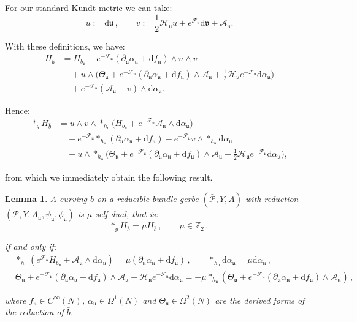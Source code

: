 \documentclass[10pt,a4paper,twoside,reqno]{amsart}
\theoremstyle{plain}
\newtheorem{lemma}[thm]{Lemma}
\theoremstyle{definition}
\theoremstyle{remark}
\def\dd{\mathrm{d}}
\def\cH{\mathcal{H}}
\def\cA{\mathcal{A}}
\def\cP{\mathcal{P}}
\def\cP{\mathcal{P}}
\def\cF{\mathcal{F}}
\def\cH{\mathcal{H}}
\def\dd{\mathrm{d}}
\def\fru{\mathfrak{u}}
\def\frv{\mathfrak{v}}
\begin{document}
\noindent
For our standard Kundt metric we can take:
\begin{equation*}
u := \dd \fru \, , \qquad v := \frac{1}{2} \cH_{\fru} u + e^{\cF_{\fru}} \dd\frv + \cA_{\fru}.
\end{equation*}

\noindent
With these definitions, we have:
\begin{align*}
H_{\bar{b}} &= H_{b_{\fru}} + e^{-\cF_{\fru}} (\partial_{\fru}\alpha_{\fru} + \dd f_{\fru})  \wedge u \wedge v \\
&\quad + u\wedge \Big(\Theta_{\fru} + e^{-\cF_{\fru}} (\partial_{\fru}\alpha_{\fru} + \dd f_{\fru}) \wedge \cA_{\fru} + \frac{1}{2}\cH_{\fru} e^{-\cF_{\fru}}   \dd \alpha_{\fru} \Big) \\
&\quad + e^{-\cF_{\fru}} (\cA_{\fru} - v)\wedge \dd \alpha_{\fru}.
\end{align*}

Hence:
\begin{align*}
\ast_g H_{\bar{b}} & = u\wedge v \wedge \ast_{h_{\fru}}  \Big( H_{b_{\fru}} + e^{-\cF_{\fru}} \cA_{\fru}  \wedge \dd \alpha_{\fru}\Big) \\
&\quad - e^{-\cF_{\fru}} \ast_{h_{\fru}} (\partial_{\fru}\alpha_{\fru} + \dd f_{\fru}) - e^{-\cF_{\fru}}   v \wedge \ast_{h_{\fru}} \dd \alpha_{\fru}\\
&\quad - u\wedge \ast_{h_{\fru}} \Big( \Theta_{\fru} + e^{-\cF_{\fru}} (\partial_{\fru}\alpha_{\fru} + \dd f_{\fru}) \wedge \cA_{\fru} + \frac{1}{2} \cH_{\fru} e^{-\cF_{\fru}}   \dd \alpha_{\fru} \Big),
\end{align*}

\noindent
from which we immediately obtain the following result.

\begin{lemma}
\label{lemma:selfdualH}
A curving $\bar{b}$ on a reducible bundle gerbe $(\bar{\cP},\bar{Y},\bar{A})$ with reduction $(\cP,Y,A_{\fru} , \psi_{\fru} , \phi_{\fru})$ is $\mu$-self-dual, that is:
\begin{equation*}
\ast_g H_{\bar{b}} = \mu H_{\bar{b}}\, , \qquad \mu \in \mathbb{Z}_2\, ,
\end{equation*}

\noindent
if and only if:
\begin{eqnarray*}
& \ast_{h_{\fru}}  ( e^{\cF_{\fru}}  H_{b_{\fru}} +  \cA_{\fru}  \wedge \dd \alpha_{\fru}) = \mu  (\partial_{\fru}\alpha_{\fru} + \dd f_{\fru})  \, ,\qquad \ast_{h_{\fru}} \dd\alpha_{\fru} = \mu \dd\alpha_{\fru}\, ,\\
& \Theta_{\fru} + e^{-\cF_{\fru}} (\partial_{\fru}\alpha_{\fru} + \dd f_{\fru}) \wedge \cA_{\fru} + \cH_{\fru} e^{-\cF_{\fru}}   \dd \alpha_{\fru} = -\mu \ast_{h_{\fru}} ( \Theta_{\fru} + e^{-\cF_{\fru}} (\partial_{\fru}\alpha_{\fru} + \dd f_{\fru}) \wedge \cA_{\fru} )\, ,
\end{eqnarray*}

\noindent
where $f_{\fru}\in C^{\infty}(N)$, $\alpha_{\fru}\in \Omega^1(N)$ and $\Theta_{\fru}\in \Omega^2(N)$ are the derived forms of the reduction of $\bar{b}$.
\end{lemma}
\end{document}
